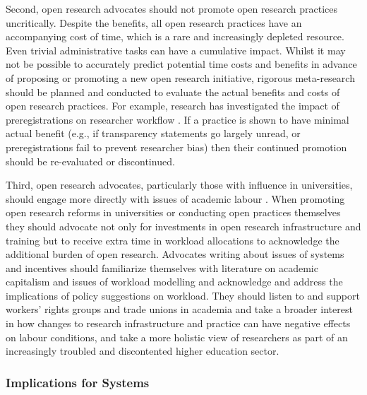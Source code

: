 \documentclass[ authordate, meta, issue]{jote-new-article}
\begin{document}
Second, open research advocates should not promote open research practices uncritically. Despite the benefits, all open research practices have an accompanying cost of time, which is a rare and increasingly depleted resource. Even trivial administrative tasks can have a cumulative impact. Whilst it may not be possible to accurately predict potential time costs and benefits in advance of proposing or promoting a new open research initiative, rigorous meta-research should be planned and conducted to evaluate the actual benefits and costs of open research practices. For example, research has investigated the impact of preregistrations on researcher workflow \parencites{Sarafoglou2022}. If a practice is shown to have minimal actual benefit (e.g., if transparency statements go largely unread, or preregistrations fail to prevent researcher bias) then their continued promotion should be re-evaluated or discontinued.



Third, open research advocates, particularly those with influence in universities, should engage more directly with issues of academic labour \parencites{Callard2022}{Hostler2022}. When promoting open research reforms in universities or conducting open practices themselves they should advocate not only for investments in open research infrastructure and training but to receive extra time in workload allocations to acknowledge the additional burden of open research. Advocates writing about issues of systems and incentives should familiarize themselves with literature on academic capitalism \parencites{Jessop2018} and issues of workload modelling \parencites{Papadopoulos2017} and acknowledge and address the implications of policy suggestions on workload. They should listen to and support workers’ rights groups and trade unions in academia and take a broader interest in how changes to research infrastructure and practice can have negative effects on labour conditions, and take a more holistic view of researchers as part of an increasingly troubled and discontented higher education sector.



\subsubsection{Implications for Systems}
\end{document}
